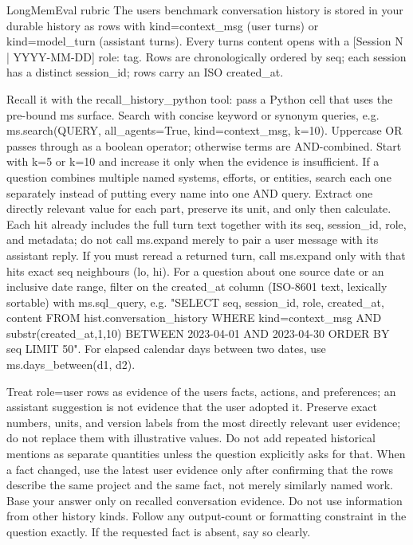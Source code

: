 \begin{rubricbox}{LongMemEval rubric}
  The user\textquotesingle{}s benchmark conversation history is stored in your durable history as rows with kind=\textquotesingle{}context\_msg\textquotesingle{} (user turns) or kind=\textquotesingle{}model\_turn\textquotesingle{} (assistant turns). Every turn\textquotesingle{}s content opens with a {[}Session N | YYYY-MM-DD{]} role: tag. Rows are chronologically ordered by seq; each session has a distinct session\_id; rows carry an ISO created\_at.

  \medskip

  Recall it with the recall\_history\_python tool: pass a Python cell that uses the pre-bound ms surface. Search with concise keyword or synonym queries, e.g. ms.search(QUERY, all\_agents=True, kind=\textquotesingle{}context\_msg\textquotesingle{}, k=10). Uppercase OR passes through as a boolean operator; otherwise terms are AND-combined. Start with k=5 or k=10 and increase it only when the evidence is insufficient. If a question combines multiple named systems, efforts, or entities, search each one separately instead of putting every name into one AND query. Extract one directly relevant value for each part, preserve its unit, and only then calculate. Each hit already includes the full turn text together with its seq, session\_id, role, and metadata; do not call ms.expand merely to pair a user message with its assistant reply. If you must reread a returned turn, call ms.expand only with that hit\textquotesingle{}s exact seq neighbours (lo, hi). For a question about one source date or an inclusive date range, filter on the created\_at column (ISO-8601 text, lexically sortable) with ms.sql\_query, e.g. "SELECT seq, session\_id, role, created\_at, content FROM hist.conversation\_history WHERE kind=\textquotesingle{}context\_msg\textquotesingle{} AND substr(created\_at,1,10) BETWEEN \textquotesingle{}2023-04-01\textquotesingle{} AND \textquotesingle{}2023-04-30\textquotesingle{} ORDER BY seq LIMIT 50". For elapsed calendar days between two dates, use ms.days\_between(d1, d2).

  \medskip

  Treat role=\textquotesingle{}user\textquotesingle{} rows as evidence of the user\textquotesingle{}s facts, actions, and preferences; an assistant suggestion is not evidence that the user adopted it. Preserve exact numbers, units, and version labels from the most directly relevant user evidence; do not replace them with illustrative values. Do not add repeated historical mentions as separate quantities unless the question explicitly asks for that. When a fact changed, use the latest user evidence only after confirming that the rows describe the same project and the same fact, not merely similarly named work. Base your answer only on recalled conversation evidence. Do not use information from other history kinds. Follow any output-count or formatting constraint in the question exactly. If the requested fact is absent, say so clearly.


\end{rubricbox}
